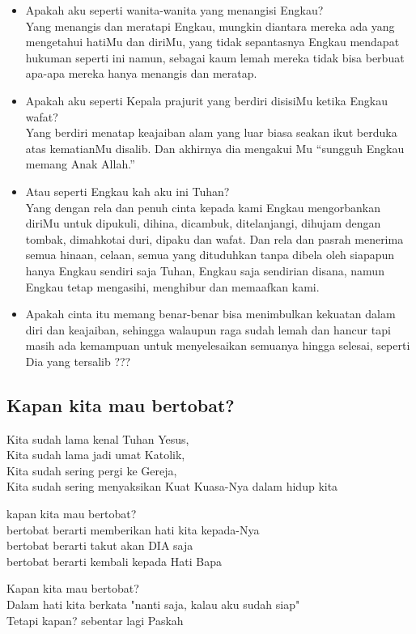 \documentclass[a5paper,headsepline,titlepage,11pt,nnormalheadings,DIVcalc]{scrbook}
\newcommand{\BPP}[1]{\begin{itemize} \item[Bpk:] #1 \end{itemize}}
\newcommand{\BPW}[1]{\begin{itemize} \item[Ibu:] #1 \end{itemize}}
\begin{document}
\BPP{Apakah aku seperti wanita-wanita yang menangisi Engkau?\\
Yang menangis dan meratapi Engkau, mungkin diantara mereka ada yang
mengetahui hatiMu dan diriMu, yang tidak sepantasnya Engkau mendapat
hukuman seperti ini namun, sebagai kaum lemah mereka tidak bisa berbuat
apa-apa mereka hanya menangis dan meratap.}

\BPW{Apakah aku seperti Kepala prajurit yang berdiri disisiMu ketika Engkau
wafat?\\
Yang berdiri menatap keajaiban alam yang luar biasa seakan ikut berduka
atas kematianMu disalib. Dan akhirnya dia mengakui Mu “sungguh Engkau
memang Anak Allah.”}

\BPP{Atau seperti Engkau kah aku ini Tuhan?\\
Yang dengan rela dan penuh cinta kepada kami Engkau mengorbankan diriMu
untuk dipukuli, dihina, dicambuk, ditelanjangi, dihujam dengan tombak,
dimahkotai duri, dipaku dan wafat. Dan rela dan pasrah menerima semua
hinaan, celaan, semua yang dituduhkan tanpa dibela oleh siapapun hanya
Engkau sendiri saja Tuhan, Engkau saja sendirian disana,
namun Engkau tetap mengasihi, menghibur dan memaafkan
kami.}

\BPW{Apakah cinta itu memang benar-benar bisa menimbulkan kekuatan dalam diri
dan keajaiban, sehingga walaupun raga sudah lemah dan hancur tapi masih ada
kemampuan untuk menyelesaikan semuanya hingga selesai, seperti Dia yang
tersalib ???}

\subsection*{Kapan kita mau bertobat?}

Kita sudah lama kenal Tuhan Yesus,\\
Kita sudah lama jadi umat Katolik,\\
Kita sudah sering pergi ke Gereja,\\
Kita sudah sering menyaksikan
Kuat Kuasa-Nya dalam hidup kita

kapan kita mau bertobat?\\
bertobat berarti memberikan hati kita kepada-Nya\\
bertobat berarti takut akan DIA saja\\
bertobat berarti kembali kepada Hati Bapa

Kapan kita mau bertobat?\\
Dalam hati kita berkata "nanti saja, kalau aku sudah siap"\\
Tetapi kapan? sebentar lagi Paskah
\end{document}
